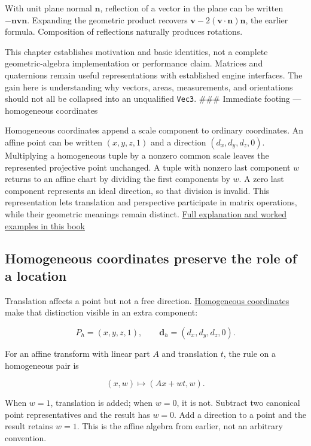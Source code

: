 With unit plane normal \(\mathbf n\), reflection of a vector in the plane can be written \(-\mathbf n\mathbf v\mathbf n\). Expanding the geometric product recovers \(\mathbf v-2(\mathbf v\cdot\mathbf n)\mathbf n\), the earlier formula. Composition of reflections naturally produces rotations.

This chapter establishes motivation and basic identities, not a complete geometric-algebra implementation or performance claim. Matrices and quaternions remain useful representations with established engine interfaces. The gain here is understanding why vectors, areas, measurements, and orientations should not all be collapsed into an unqualified \texttt{Vec3}. \#\#\# Immediate footing --- homogeneous coordinates

Homogeneous coordinates append a scale component to ordinary coordinates. An affine point can be written \((x,y,z,1)\) and a direction \((d_x,d_y,d_z,0)\). Multiplying a homogeneous tuple by a nonzero common scale leaves the represented projective point unchanged. A tuple with nonzero last component \(w\) returns to an affine chart by dividing the first components by \(w\). A zero last component represents an ideal direction, so that division is invalid. This representation lets translation and perspective participate in matrix operations, while their geometric meanings remain distinct. \hyperref[01-foundations-i-ch018-homogeneous-coordinates-preserve-the-role-of-a-location]{Full explanation and worked examples in this book}

\subsection{Homogeneous coordinates preserve the role of a location}\label{01-foundations-i-ch018-homogeneous-coordinates-preserve-the-role-of-a-location}

Translation affects a point but not a free direction. \hyperref[01-foundations-i-ch019-figure-m6---follow-one-point-through-named-spaces]{Homogeneous coordinates} make that distinction visible in an extra component:

\[
P_h=(x,y,z,1),\qquad \mathbf d_h=(d_x,d_y,d_z,0).
\]

For an affine transform with linear part \(A\) and translation \(t\), the rule on a homogeneous pair is

\[
(x,w)\longmapsto(Ax+wt,w).
\]

When \(w=1\), translation is added; when \(w=0\), it is not. Subtract two canonical point representatives and the result has \(w=0\). Add a direction to a point and the result retains \(w=1\). This is the affine algebra from earlier, not an arbitrary convention.

